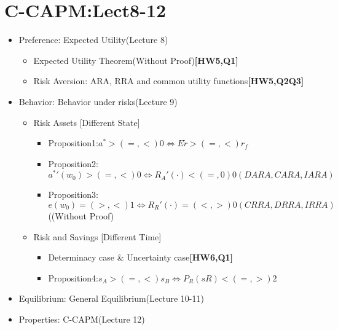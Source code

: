\documentclass{beamer}
\begin{document}
	\section{C-CAPM:Lect8-12}
	\label{sec:GE-Model}
	\begin{frame}
	\begin{itemize}
		\item Preference: Expected Utility(Lecture 8)
			\begin{itemize}
				\item Expected Utility Theorem(Without Proof)\textbf{[HW5,Q1]}
				\item Risk Aversion: ARA, RRA and common utility functions\textbf{[HW5,Q2Q3]}
			\end{itemize}
		\item Behavior: Behavior under risks(Lecture 9)
			\begin{itemize}
				\item Risk Assets [Different State]	
				\begin{itemize}
					\item Proposition1:$a^*>(=,<)0 \Leftrightarrow E\tilde{r}>(=,<)r_f$
					\item Proposition2:$a^*'(w_0)>(=,<)0 \Leftrightarrow R_A'(\cdot)<(=,0)0(DARA,CARA,IARA)$
					\item Proposition3:$e(w_0)=(>,<)1 \Leftrightarrow R_R'(\cdot)=(<,>)0(CRRA,DRRA,IRRA)$((Without Proof)
				\end{itemize}
				\item Risk and Savings [Different Time]
				\begin{itemize}
					\item Determinacy case \& Uncertainty case\textbf{[HW6,Q1]}
					\item Proposition4:$s_A>(=,<)s_B\Leftrightarrow P_R(sR)<(=,>)2$
				\end{itemize}
			\end{itemize}
		\item Equilibrium: General Equilibrium(Lecture 10-11)
		\item Properties: C-CAPM(Lecture 12)
	\end{itemize}
	\end{frame}
	
\end{document}
